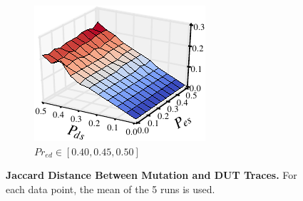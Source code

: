 \begin{figure}[t!]
\begin{subfigure}{0.33\textwidth}
  \end{subfigure}\hspace*{0.01\textwidth}
  \begin{subfigure}{0.33\textwidth}
    \centering
    \includegraphics[width=\textwidth]{./figures/scripts/MutationDUTJaccard3DFigure_0_50.pdf}
    \caption{$Pr_{ed} \in [0.40, 0.45, 0.50]$}
  \end{subfigure}\hspace*{0.01\textwidth}
  \caption{\textbf{Jaccard Distance Between Mutation and DUT Traces.} For each
  data point, the mean of the 5 runs is used.}
  \label{fig:mutation_dut}
\end{figure}

